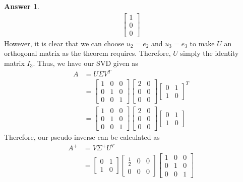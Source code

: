 \documentclass[10pt,a4paper]{article}
\theoremstyle{definition}
\newtheorem*{answer*}{Answer}
\theoremstyle{definition}
\numberwithin{equation}{section}
\begin{document}
\begin{answer*}
\begin{align*}
\begin{bmatrix}
1\\0\\0
\end{bmatrix}
\end{align*}
However, it is clear that we can choose $u_2 = e_2$ and $u_3 = e_3$ to make $U$ an orthogonal matrix as the theorem requires. Therefore, $U$ simply the identity matrix $I_3$. Thus, we have our SVD given as
\begin{align*}
A &= U\Sigma V^T\\
&= \begin{bmatrix}
1 & 0 & 0\\
0 & 1 & 0\\
0 & 0 & 1
\end{bmatrix} \begin{bmatrix}
2 & 0\\
0 & 0\\
0 & 0
\end{bmatrix} \begin{bmatrix}
0 & 1\\
1 & 0
\end{bmatrix}^T\\
&= \begin{bmatrix}
1 & 0 & 0\\
0 & 1 & 0\\
0 & 0 & 1
\end{bmatrix} \begin{bmatrix}
2 & 0\\
0 & 0\\
0 & 0
\end{bmatrix} \begin{bmatrix}
0 & 1\\
1 & 0
\end{bmatrix}
\end{align*}
Therefore, our pseudo-inverse can be calculated as
\begin{align*}
A^+ &= V \Sigma^+ U^T\\
&= \begin{bmatrix}
0 & 1\\
1 & 0
\end{bmatrix} \begin{bmatrix}
\frac{1}{2} & 0 & 0\\
0 & 0 & 0
\end{bmatrix} \begin{bmatrix}
1 & 0 & 0\\
0 & 1 & 0\\
0 & 0 & 1
\end{bmatrix}\\

\end{align*}
\end{answer*}
\end{document}
